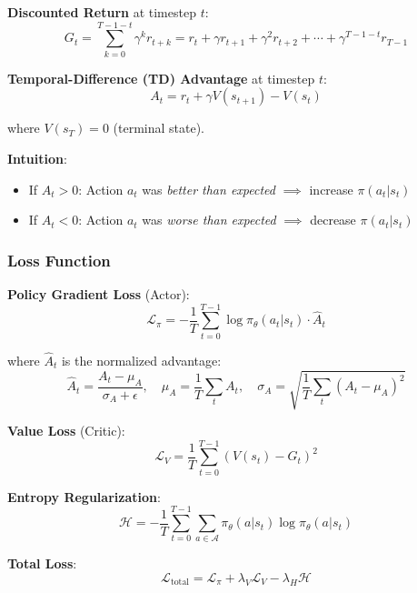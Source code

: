 \documentclass[11pt]{article}
\begin{document}
\textbf{Discounted Return} at timestep $t$:
\begin{equation}
G_t = \sum_{k=0}^{T-1-t} \gamma^k r_{t+k} = r_t + \gamma r_{t+1} + \gamma^2 r_{t+2} + \cdots + \gamma^{T-1-t} r_{T-1}
\end{equation}

\textbf{Temporal-Difference (TD) Advantage} at timestep $t$:
\begin{equation}
\boxed{A_t = r_t + \gamma V(s_{t+1}) - V(s_t)}
\end{equation}

where $V(s_{T}) = 0$ (terminal state).

\textbf{Intuition}: 
\begin{itemize}[nosep]
    \item If $A_t > 0$: Action $a_t$ was \emph{better than expected} $\implies$ increase $\pi(a_t|s_t)$
    \item If $A_t < 0$: Action $a_t$ was \emph{worse than expected} $\implies$ decrease $\pi(a_t|s_t)$
\end{itemize}

\subsubsection{Loss Function}

\textbf{Policy Gradient Loss} (Actor):
\begin{equation}
\mathcal{L}_\pi = -\frac{1}{T} \sum_{t=0}^{T-1} \log \pi_\theta(a_t|s_t) \cdot \hat{A}_t
\end{equation}

where $\hat{A}_t$ is the normalized advantage:
\begin{equation}
\hat{A}_t = \frac{A_t - \mu_A}{\sigma_A + \epsilon}, \quad \mu_A = \frac{1}{T}\sum_t A_t, \quad \sigma_A = \sqrt{\frac{1}{T}\sum_t (A_t - \mu_A)^2}
\end{equation}

\textbf{Value Loss} (Critic):
\begin{equation}
\mathcal{L}_V = \frac{1}{T} \sum_{t=0}^{T-1} (V(s_t) - G_t)^2
\end{equation}

\textbf{Entropy Regularization}:
\begin{equation}
\mathcal{H} = -\frac{1}{T} \sum_{t=0}^{T-1} \sum_{a \in \mathcal{A}} \pi_\theta(a|s_t) \log \pi_\theta(a|s_t)
\end{equation}

\textbf{Total Loss}:
\begin{equation}
\boxed{\mathcal{L}_{\text{total}} = \mathcal{L}_\pi + \lambda_V \mathcal{L}_V - \lambda_H \mathcal{H}}
\end{equation}
\end{document}
